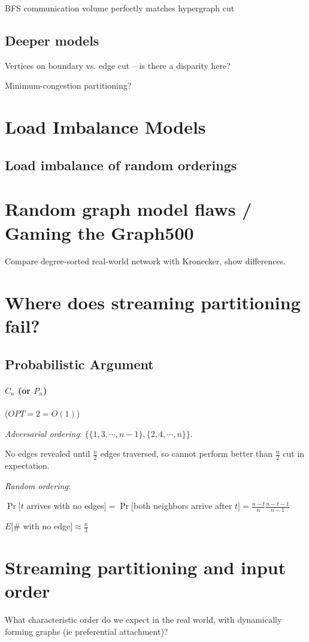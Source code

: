 \documentclass[11pt]{article}
\begin{document}
BFS communication volume perfectly matches hypergraph cut \cite{Catalyurek_hypergraph-partitioningbased}

\subsection{Deeper models}
Vertices on boundary vs. edge cut -- is there a disparity here?

Minimum-congestion partitioning?

\section{Load Imbalance Models}
\subsection{Load imbalance of random orderings}
\cite{journals/cj/GanleyH94}

\section{Random graph model flaws / Gaming the Graph500}
Compare degree-sorted real-world network with Kronecker, show differences.

\section{Where does streaming partitioning fail?}
\subsection{Probabilistic Argument}
\paragraph{$C_n$ (or $P_n$)} ($OPT=2=O(1)$)

\textit{Adversarial ordering}: $\{ \{ 1,3, \cdots , n-1\},\{ 2, 4, \cdots, n \}\}$. 

No edges revealed until $\frac{n}{2}$ edges traversed, so cannot perform better than $\frac{n}{2}$ cut in expectation.

\textit{Random ordering}: 

$\Pr[t $ arrives with no edges$]  =  \Pr[$both neighbors arrive after $ t ]  = \frac{n-t}{n}\frac{n-t-1}{n-1}$ 

$E[\# $ with no edge$] \approx \frac{n}{3}$

\section{Streaming partitioning and input order}
What characteristic order do we expect in the real world, with dynamically forming graphs (ie preferential attachment)?
\end{document}
